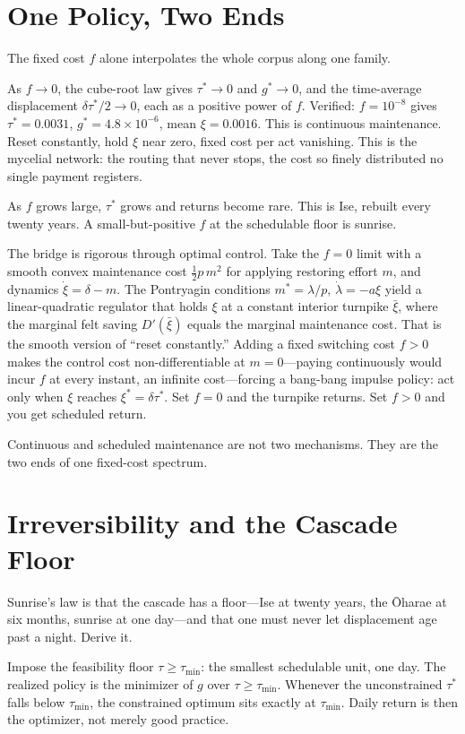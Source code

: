 \documentclass[12pt]{article}
\begin{document}
\section{One Policy, Two Ends}

The fixed cost $f$ alone interpolates the whole corpus along one family.

As $f\to 0$, the cube-root law gives $\tau^*\to 0$ and $g^*\to 0$, and the time-average displacement $\delta\tau^*/2\to 0$, each as a positive power of $f$. Verified: $f=10^{-8}$ gives $\tau^*=0.0031$, $g^*=4.8\times 10^{-6}$, mean $\xi=0.0016$. This is continuous maintenance. Reset constantly, hold $\xi$ near zero, fixed cost per act vanishing. This is the mycelial network: the routing that never stops, the cost so finely distributed no single payment registers.

As $f$ grows large, $\tau^*$ grows and returns become rare. This is Ise, rebuilt every twenty years. A small-but-positive $f$ at the schedulable floor is sunrise.

The bridge is rigorous through optimal control. Take the $f=0$ limit with a smooth convex maintenance cost $\tfrac{1}{2}p\,m^2$ for applying restoring effort $m$, and dynamics $\dot\xi=\delta-m$. The Pontryagin conditions $m^*=\lambda/p$, $\dot\lambda=-a\xi$ yield a linear-quadratic regulator that holds $\xi$ at a constant interior turnpike $\bar\xi$, where the marginal felt saving $D'(\bar\xi)$ equals the marginal maintenance cost. That is the smooth version of ``reset constantly.'' Adding a fixed switching cost $f>0$ makes the control cost non-differentiable at $m=0$---paying continuously would incur $f$ at every instant, an infinite cost---forcing a bang-bang impulse policy: act only when $\xi$ reaches $\xi^*=\delta\tau^*$. Set $f=0$ and the turnpike returns. Set $f>0$ and you get scheduled return.

Continuous and scheduled maintenance are not two mechanisms. They are the two ends of one fixed-cost spectrum.

\section{Irreversibility and the Cascade Floor}

Sunrise's law is that the cascade has a floor---Ise at twenty years, the Ōharae at six months, sunrise at one day---and that one must never let displacement age past a night. Derive it.

Impose the feasibility floor $\tau\ge\tau_{\min}$: the smallest schedulable unit, one day. The realized policy is the minimizer of $g$ over $\tau\ge\tau_{\min}$. Whenever the unconstrained $\tau^*$ falls below $\tau_{\min}$, the constrained optimum sits exactly at $\tau_{\min}$. Daily return is then the optimizer, not merely good practice.
\end{document}
